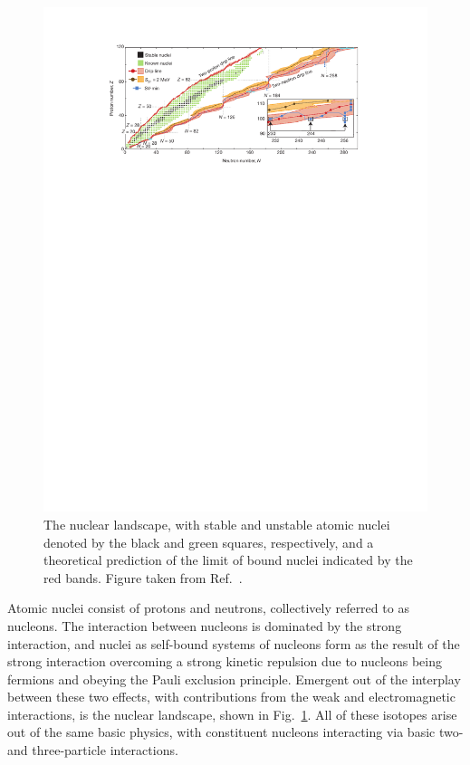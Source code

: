\begin{figure}[t]
  \centering
  \includegraphics[width=1.0\textwidth]{thesis/doc/images/external/nuclear_landscape_embedded.pdf}
  \caption[
    The nuclear landscape,
    with stable and unstable atomic nuclei denoted by the black and green squares, respectively,
    and a theoretical prediction of the limit of bound nuclei indicated by the red bands.
  ]{
    The nuclear landscape,
    with stable and unstable atomic nuclei denoted by the black and green squares, respectively,
    and a theoretical prediction of the limit of bound nuclei indicated by the red bands.
    Figure taken from Ref.~\cite{Erle12limits}.
  }\label{fig:nuclear_landscape}
\end{figure}

Atomic nuclei consist of protons and neutrons, collectively referred to as nucleons.
The interaction between nucleons is dominated by the strong interaction,
and nuclei as self-bound systems of nucleons form as the result of the strong interaction
overcoming a strong kinetic repulsion
due to nucleons being fermions and obeying the Pauli exclusion principle.
Emergent out of the interplay between these two effects,
with contributions from the weak and electromagnetic interactions,
is the nuclear landscape,
shown in Fig.~\ref{fig:nuclear_landscape}.
All of these isotopes arise out of the same basic physics,
with constituent nucleons interacting via basic two- and three-particle interactions.


